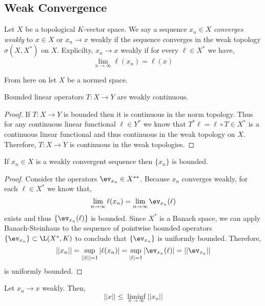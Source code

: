 \documentclass[12pt]{article}
\begin{document}
\subsection{Weak Convergence}

\begin{defn}
Let $X$ be a topological $K$-vector space. We say a sequence $x_n \in X$ \textit{converges weakly} to $x \in X$ or $x_n \to x$ weakly if the sequence converges in the weak topology $\sigma(X, X^*)$ on $X$. Explicilty, $x_n \to x$ weakly if for every $\ell \in X^*$ we have,
\[ \lim_{n \to \infty} \ell(x_n) = \ell(x) \]
\end{defn}

\begin{rmk}
From here on let $X$ be a normed space.
\end{rmk}

\begin{prop}
Bounded linear operators $T : X \to Y$ are weakly continuous.
\end{prop}

\begin{proof}
If $T : X \to Y$ is bounded then it is continuous in the norm topology. Thus for any continuous linear functional $\ell \in Y^*$ we know that $T^* \ell = \ell \circ T \in X^*$ is a continuous linear functional and thus continuous in the weak topology on $X$. Therefore, $T : X \to Y$ is continuous in the weak topologies.
\end{proof}

\begin{prop}
If $x_n \in X$ is a weakly convergent sequence then $\{ x_n \}$ is bounded.
\end{prop}

\begin{proof}
Consider the operators $\ev_{x_n} \in X^{**}$. Because $x_n$ converges weakly, for each $\ell \in X^*$ we know that,
\[ \lim_{n \to \infty} \ell(x_n) = \lim_{n \to \infty} \ev_{x_n}(\ell) \]
exists and thus $\{ \ev_{x_n}(\ell) \}$ is bounded. Since $X^*$ is a Banach space, we can apply Banach-Steinhaus to the sequence of pointwise bounded operators $\{ \ev_{x_n} \} \subset \L(X^*, K)$ to conclude that $\{ \ev_{x_n} \}$ is uniformly bounded. Therefore,
\[ || x_n || = \sup_{|| \ell || = 1} | \ell(x_n) | = \sup_{| \ell | = 1} | \ev_{x_n}(\ell) | = || \ev_{x_n} || \]
is uniformly bounded.
\end{proof}

\begin{prop}
Let $x_n \to x$ weakly. Then,
\[ || x || \le \liminf_{n \to \infty} || x_n || \]
\end{prop}
\end{document}
